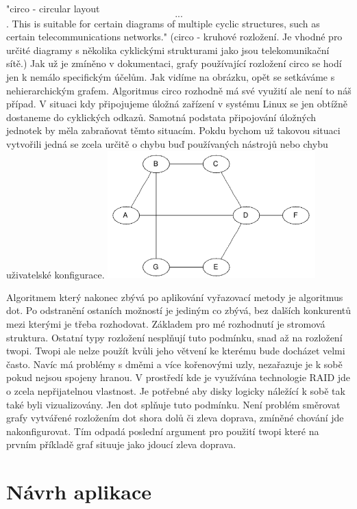\documentclass[color,table,oneside,nolot,nolof]{fithesis}
\begin{document}
	"circo - circular layout \[...\]. This is suitable for certain diagrams of multiple cyclic structures, such as certain telecommunications networks."\cite{graphviz_layout} (circo -
	kruhové rozložení. Je vhodné pro určité diagramy s několika cyklickými strukturami jako jsou telekomunikační sítě.) Jak už je zmíněno v dokumentaci, grafy používající rozložení 
	circo se hodí jen k nemálo specifickým účelům. Jak vidíme na obrázku, opět se setkáváme s nehierarchickým grafem. Algoritmus circo rozhodně má své využití ale není to náš případ. V
	situaci kdy připojujeme úložná zařízení v systému Linux se jen obtížně dostaneme do cyklických odkazů. Samotná podstata připojování úložných jednotek by měla zabraňovat těmto
	situacím. Pokdu bychom už takovou situaci vytvořili jedná se zcela určitě o chybu buď používaných nástrojů nebo chybu uživatelské konfigurace. 
	\includegraphics[width=0.6\textwidth]{pictures/circo_example.png} 

	Algoritmem který nakonec zbývá po aplikování vyřazovací metody je algoritmus dot. Po odstranění ostaních možností je jediným co zbývá, bez dalších konkurentů mezi kterými je třeba 
	rozhodovat. Základem pro mé rozhodnutí je stromová struktura. Ostatní typy rozložení nesplňují tuto podmínku, snad až na rozložení twopi. Twopi ale nelze použít kvůli jeho větvení
	ke kterému bude docházet velmi často. Navíc má problémy s dměmi a více kořenovými uzly, nezařazuje je k sobě pokud nejsou spojeny hranou. V prostředí kde je využívána technologie
	RAID jde o zcela nepřijatelnou vlastnost. Je potřebné aby disky logicky náležící k sobě tak také byli vizualizovány. Jen dot splňuje tuto podmínku. Není problém směrovat grafy 
	vytvářené rozložením dot shora dolů či zleva doprava, zmíněné chování jde nakonfigurovat. Tím odpadá poslední argument pro použití twopi které na prvním příkladě graf situuje jako
	jdoucí zleva doprava.

\chapter{Návrh aplikace}
\end{document}

